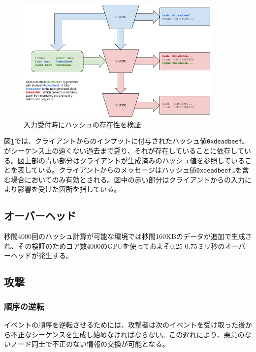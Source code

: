 \documentclass[12pt]{ltjsarticle}
\begin{document}
\begin{figure}
  \begin{center}
    \centering
    \includegraphics[width=0.9\textwidth]{../../figures/fig_6.png}
    \caption[Fig 6]{入力受付時にハッシュの存在性を検証\label{fig:poh_consistency}}
  \end{center}
  \end{figure}

図\ref{fig:poh_consistency}では、クライアントからのインプットに付与されたハッシュ値\texttt{0xdeadbeef\ldots}がシーケンス上の遠くない過去まで遡り、それが存在していることに依存している。図上部の青い部分はクライアントが生成済みのハッシュ値を参照していることを表している。クライアントからのメッセージはハッシュ値\texttt{0xdeadbeef\ldots}を含む場合においてのみ有効とされる。図中の赤い部分はクライアントからの入力により影響を受けた箇所を指している。

\subsection{オーバーヘッド}
秒間4000回のハッシュ計算が可能な環境では秒間160KBのデータが追加で生成され、その検証のためコア数4000のGPUを使っておよそ0.25-0.75ミリ秒のオーバーヘッドが発生する。

\subsection{攻撃}
\subsubsection{順序の逆転}
 イベントの順序を逆転させるためには、攻撃者は次のイベントを受け取った後から不正なシーケンスを生成し始めなければならない。この遅れにより、悪意のないノード同士で不正のない情報の交換が可能となる。
\end{document}
